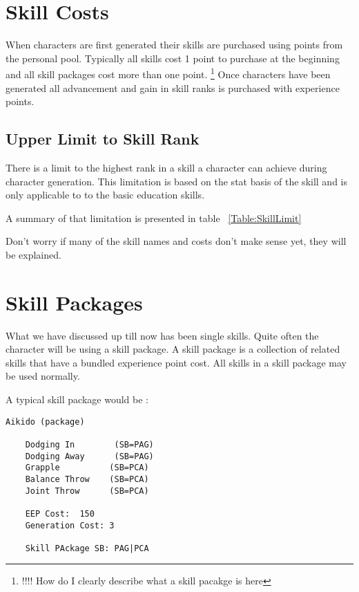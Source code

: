 \section{Skill Costs}

When characters are first generated their skills are purchased
using points from the personal pool. Typically all skills cost 1 point 
to purchase at the beginning and all skill packages cost more than
one point.
\footnote{!!!! How do I clearly describe what a skill pacakge is here}
Once characters have been generated all advancement and gain in skill
ranks is purchased with experience points.

\subsection{Upper Limit to Skill Rank}

There is a limit to the highest rank in a skill a character can
achieve during character generation. This limitation
is based on the stat basis of the skill and is only applicable to to
the basic education skills.

A summary of that limitation is presented in table ~\ref{Table:SkillLimit}



Don't worry if many of the skill names and costs don't make sense
yet, they will be explained.

\section{Skill Packages}

What we have discussed up till now has been single skills.
Quite often the character will be using a skill package.
A skill package is a collection of related skills that have a bundled 
experience point cost. All skills in a skill package may be used 
normally.

A typical skill package would be :

\begin{verbatim}
Aikido (package)

	Dodging In		  (SB=PAG)
	Dodging Away	  (SB=PAG)
	Grapple			 (SB=PCA)
	Balance Throw	 (SB=PCA)
	Joint Throw		 (SB=PCA)

	EEP Cost:  150
	Generation Cost: 3

	Skill PAckage SB: PAG|PCA

\end{verbatim}

